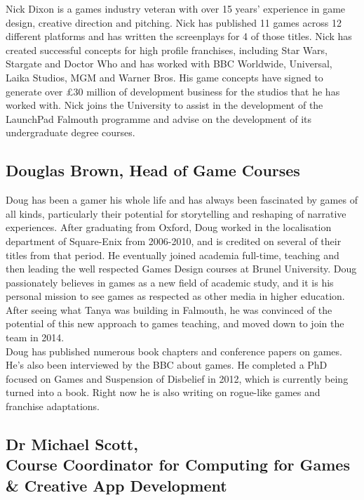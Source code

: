 Nick Dixon is a games industry veteran with over 15 years' experience in game design, creative direction and pitching. Nick has published 11 games across 12 different platforms and has written the screenplays for 4 of those titles. Nick has created successful concepts for high profile franchises, including Star Wars, Stargate and Doctor Who and has worked with BBC Worldwide, Universal, Laika Studios, MGM and Warner Bros. His game concepts have signed to generate over £30 million of development business for the studios that he has worked with. Nick joins the University to assist in the development of the LaunchPad Falmouth programme and advise on the development of its undergraduate degree courses. 

\subsection[Douglas Brown]{Douglas Brown, Head of Game Courses}

Doug has been a gamer his whole life and has always been fascinated by games of all kinds, particularly their potential for storytelling and reshaping of narrative experiences. After graduating from Oxford, Doug worked in the localisation department of Square-Enix from 2006-2010, and is credited on several of their titles from that period. He eventually joined academia full-time, teaching and then leading the well respected Games Design courses at Brunel University. Doug passionately believes in games as a new field of academic study, and it is his personal mission to see games as respected as other media in higher education. After seeing what Tanya was building in Falmouth, he was convinced of the potential of this new approach to games teaching, and moved down to join the team in 2014. \\

Doug has published numerous book chapters and conference papers on games. He's also been interviewed by the BBC about games. He completed a PhD focused on Games and Suspension of Disbelief in 2012, which is currently being turned into a book. Right now he is also writing on rogue-like games and franchise adaptations. \\

\subsection[Michael Scott]{Dr Michael Scott, \\ Course Coordinator for Computing for Games \& Creative App Development}


